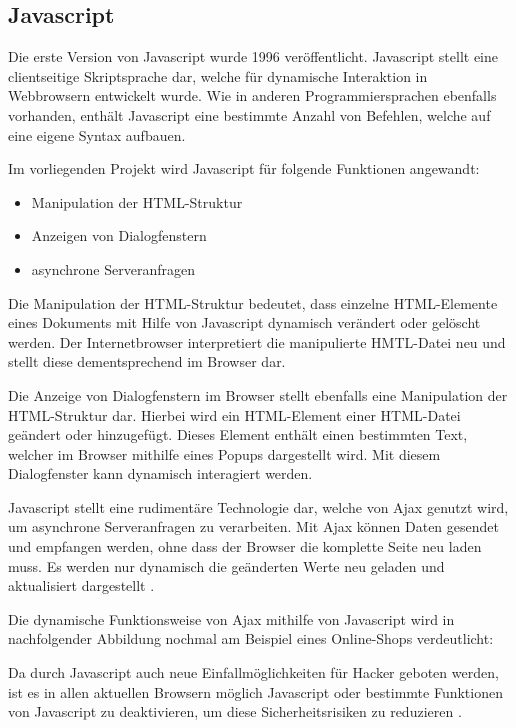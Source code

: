 \subsection{Javascript}
\label{sec:Javascript}

Die erste Version von Javascript wurde 1996 veröffentlicht. Javascript stellt eine clientseitige Skriptsprache dar, welche für dynamische Interaktion in Webbrowsern entwickelt wurde. Wie in anderen Programmiersprachen ebenfalls vorhanden, enthält Javascript eine bestimmte Anzahl von Befehlen, welche auf eine eigene Syntax aufbauen.

Im vorliegenden Projekt wird Javascript für folgende Funktionen angewandt:

\begin{itemize}
  \item Manipulation der HTML-Struktur
  \item Anzeigen von Dialogfenstern
  \item asynchrone Serveranfragen
\end{itemize}

Die Manipulation der HTML-Struktur bedeutet, dass einzelne HTML-Elemente eines Dokuments mit Hilfe von Javascript dynamisch verändert oder gelöscht werden. Der Internetbrowser interpretiert die manipulierte HMTL-Datei neu und stellt diese dementsprechend im Browser dar.

Die Anzeige von Dialogfenstern im Browser stellt ebenfalls eine Manipulation der HTML-Struktur dar. Hierbei wird ein HTML-Element einer HTML-Datei geändert oder hinzugefügt. Dieses Element enthält einen bestimmten Text, welcher im Browser mithilfe eines Popups dargestellt wird. Mit diesem Dialogfenster kann dynamisch interagiert werden.

Javascript stellt eine rudimentäre Technologie dar, welche von Ajax genutzt wird, um asynchrone Serveranfragen zu verarbeiten. Mit Ajax können Daten gesendet und empfangen werden, ohne dass der Browser die komplette Seite neu laden muss. Es werden nur dynamisch die geänderten Werte neu geladen und aktualisiert dargestellt .

Die dynamische Funktionsweise von Ajax mithilfe von Javascript wird in nachfolgender Abbildung nochmal am Beispiel eines Online-Shops verdeutlicht:


Da durch Javascript auch neue Einfallmöglichkeiten für Hacker geboten werden, ist es in allen aktuellen Browsern möglich Javascript oder bestimmte Funktionen von Javascript zu deaktivieren, um diese Sicherheitsrisiken zu reduzieren .